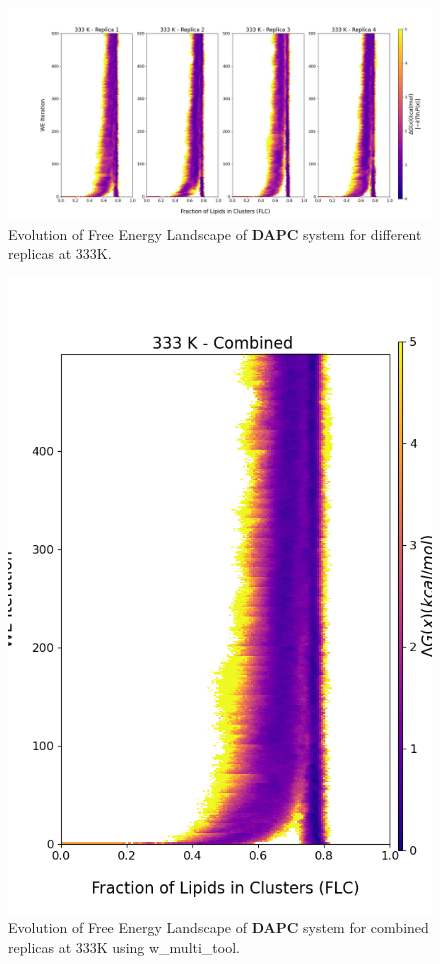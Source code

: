 \documentclass{biophys-new}
\begin{document}
\begin{figure}[hbt!]
\centering
\includegraphics[width=1.1\linewidth]{all_plots/ClusterLipids2Total/DPPC_DAPC_CHOL/333K/Evolution_DAPC_333_ClusterLipids2Total.png}
\caption{Evolution of Free Energy Landscape of \textbf{DAPC} system for different replicas at 333K.}
\label{fig:view}

\end{figure}

\begin{figure}[hbt!]
\centering
\includegraphics[width=0.8\linewidth]{all_plots/ClusterLipids2Total/DPPC_DAPC_CHOL/333K/Evolution_DAPC_MULTI__333_ClusterLipids2Total.png}
\caption{Evolution of Free Energy Landscape of \textbf{DAPC} system for combined replicas at 333K using w\_multi\_tool.}
\label{fig:view}

\end{figure}
\end{document}
